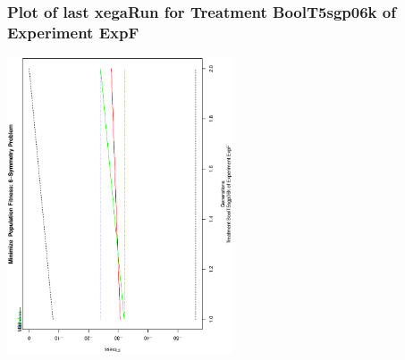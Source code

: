  \begin{frame}
 \frametitle{ Plot of last xegaRun for Treatment BoolT5sgp06k of Experiment ExpF }
 \begin{center}
\includegraphics[width=0.5\textwidth, angle=-90]
{ExpFPlotPopStatsFigure004.eps}
 \end{center}
 \label{report/ExpFPlotPopStatsFigure004.eps}  
 \end{frame}

